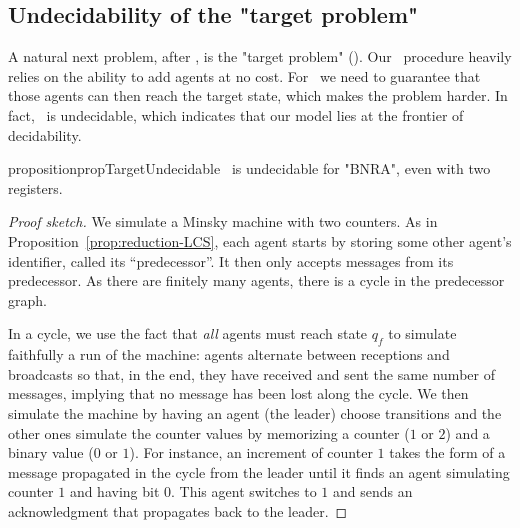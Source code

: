 \subsection{Undecidability of the "target problem"}
\label{sec:undec-target}

A natural next problem, after \COVER, is the "target problem" (\TARGET).  
Our \COVER\ procedure heavily relies on the ability to add agents at no cost. For \TARGET\ we need to guarantee that those agents can then reach the target state, which makes the problem harder. 
In fact, \TARGET\ is undecidable, which indicates that our model lies at the frontier of decidability.

\begin{restatable}{proposition}{propTargetUndecidable}
\label{prop:target-undec}
\TARGET\ is undecidable for "BNRA", even with two registers.
\end{restatable}

\begin{proof}[Proof sketch]
We simulate a Minsky machine with two counters. As in Proposition~\ref{prop:reduction-LCS},  each agent starts by storing some other agent's identifier, called its ``predecessor''. It then only accepts messages from its predecessor. As there are finitely many agents, there is a cycle in the predecessor graph. 

In a cycle, we use the fact that \emph{all} agents must reach state $q_f$ to simulate faithfully a run of the machine: agents alternate between receptions and broadcasts so that, in the end, they have received and sent the same number of messages, implying that no message has been lost along the cycle.
We then simulate the machine by having an agent (the leader) choose transitions and the other ones simulate the counter values by memorizing a counter ($1$ or $2$) and a binary value ($0$ or $1$). For instance, an increment of counter $1$ takes the form of a message propagated in the cycle from the leader until it finds an agent simulating counter $1$ and having bit $0$. This agent switches to $1$ and sends an acknowledgment that propagates back to the leader. 
\end{proof}
